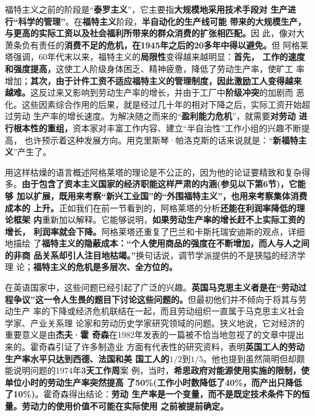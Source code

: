 福特主义之前的阶段是“\textbf{泰罗主义}”，它主要指\textbf{大规模地采用技术手段对
  生产进行“科学的管理”}。在\textbf{福特主义}阶段，\textbf{半自动化的生产线可能
  带来的大规模生产，与更高的实际工资以及社会福利所带来的群众消费的扩张相匹配。}因
此，像对大萧条负有责任的\textbf{消费不足的危机，在1945年之后的20多年中得以避免。}但
阿格莱塔强调，60年代末以来，福特主义的\textbf{局限性}变得越来越明显：\textbf{首先，
  工作的速度和强度提高，}这使工人阶级身体困乏、精神疲惫，降低了劳动生产率，使旷工
率增加；\textbf{其次，由于计件工资不适应福特主义的管理制度，因此激励工人变得越来
  越难。}这反过来又影响到劳动生产率的增长，并由于工厂中\textbf{阶级冲突}的加剧而
恶化。这些因素综合作用的后果，就是经过几十年的相对下降之后，实际工资开始超过劳动
生产率的增长速度。为解决随之而来的“\textbf{盈利能力危机}”，就需要\textbf{对劳动
  进行根本性的重组，}资本家对丰富工作内容、建立“半自治性”工作小组的兴趣不断提高，
也许预示着这种发展方向。用克里斯琴·帕洛克斯的话来说就是：“\textbf{新福特主
  义}”产生了。

用这样枯燥的语言概述阿格莱塔的理论是不公正的，因为他的论证要精致和复杂得
多。\textbf{由于包含了资本主义国家的经济职能这样严肃的内涵(参见以下第6节)，它能够
  加以扩展，既用来考察“新兴工业国”的“外围福特主义”，也用来考察集体消费成本的
  上升。}正如我们在前一节看到的，阿格莱塔的分析\textbf{还能在利润率降低的理论框架
  内}重新加以解释。它能够说明，\textbf{如果劳动生产率的增长赶不上实际工资的增长，
  利润率就会下降。}阿格莱塔还重复了巴兰和卡斯托瑞安迪斯的观点，详细地描绘
了\textbf{福特主义的隐蔽成本：“个人使用商品的强度在不断增加，而人与人之间的非商
  品关系却引人注目地枯竭。”}换句话说，调节学派提供的不是狭隘的经济学理
论；\textbf{福特主义的危机是多层次、全方位的。}

在英语国家中，这些问题已经引起了广泛的兴趣。\textbf{英国马克思主义者是在“劳动过
  程争议”这一令人生畏的题目下讨论这些问题的。}但最初他们并不倾向于将其与劳动生产
率的下降或经济危机联结在一起，而且劳动组织一直属于马克思主义社会学家、产业关系理
论家和劳动历史学家研究领域的问题。狭义地说，它对经济的重要意义是由\textbf{杰夫·霍
  奇森}在1982年发表的一篇被不恰当地忽视了的文章中提出来的。霍奇森引证了许多制造业
方面有代表性的研究资料，表明\textbf{英国工人的劳动生产率水平只达到西德、法国和美
  国工人的$1/2到1/5$}。他也提到虽然简明但却颇能说明问题的1974年\textbf{3天工作周}案
例，当时，\textbf{希思政府对能源使用实施的限制，使单位小时的劳动生产率突然提高
  了50\%(工作小时数降低了40\%，而产出只降低了10\%)}。霍奇森得出结论：\textbf{劳动
  生产率是一个变量，而不是既定技术条件下的恒量。劳动力的使用价值不可能在实际使用
  之前被提前确定。}

